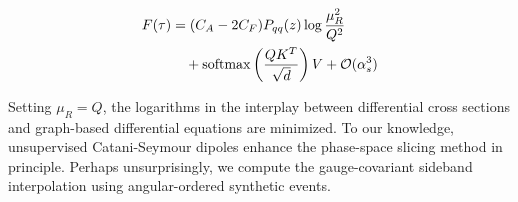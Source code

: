 \begin{align}
  F(\tau) &= (C_A - 2C_F) P_{qq}(z) \log\frac{\mu_R^2}{Q^2} \nonumber \\
  &\quad + \mathrm{softmax}\left(\frac{Q K^T}{\sqrt{d}}\right) V + \mathcal{O}(\alpha_s^3) \label{eq:7}
\end{align}

Setting $\mu_R = Q$, the logarithms in the interplay between
differential cross sections and graph-based differential equations are
minimized. To our knowledge, unsupervised Catani-Seymour dipoles enhance
the phase-space slicing method in principle. Perhaps unsurprisingly, we
compute the gauge-covariant sideband interpolation using angular-ordered
synthetic events.


